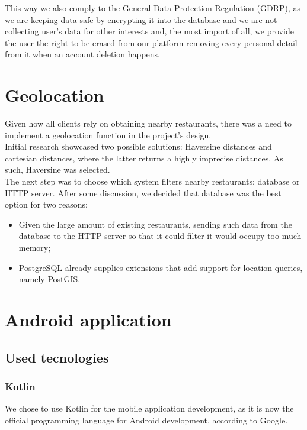 This way we also comply to the General Data Protection Regulation (GDRP)\cite{gdpr}, as we are keeping data safe by encrypting it into the database and
we are not collecting user's data for other interests and, the most import of all, we provide the user the right to be erased from our 
platform removing every personal detail from it when an account deletion happens.\\

\section{Geolocation}

Given how all clients rely on obtaining nearby restaurants, there was a need to implement a geolocation function in the project's design.\\

Initial research showcased two possible solutions: Haversine\cite{haversine} distances and cartesian distances, where the latter returns a highly imprecise distances.
As such, Haversine was selected.\\

The next step was to choose which system filters nearby restaurants: database or HTTP server. After some discussion, we decided that database was the best
option for two reasons: 
\begin{itemize}
    \item Given the large amount of existing restaurants, sending such data from the database to the HTTP server so that it could filter it would occupy too much memory;
    \item PostgreSQL already supplies extensions that add support for location queries, namely PostGIS.
\end{itemize}

\section{Android application}

\subsection{Used tecnologies}

\subsubsection{Kotlin}

We chose to use Kotlin for the mobile application development, as it is now the official programming language for Android development,
according to Google.\\

